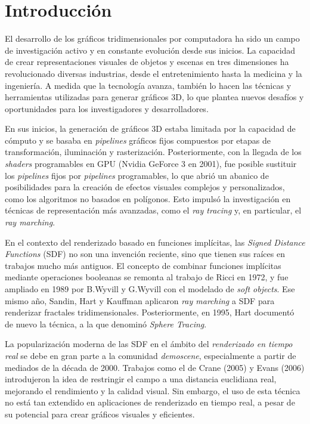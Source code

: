 \chapter{Introducción}
El desarrollo de los gráficos tridimensionales por computadora ha sido un campo
de investigación activo y en constante evolución desde sus inicios. La
capacidad de crear representaciones visuales de objetos y escenas en tres
dimensiones ha revolucionado diversas industrias, desde el entretenimiento
hasta la medicina y la ingeniería. A medida que la tecnología avanza, también
lo hacen las técnicas y herramientas utilizadas para generar gráficos 3D, lo
que plantea nuevos desafíos y oportunidades para los investigadores y
desarrolladores.

En sus inicios, la generación de gráficos 3D estaba limitada por la capacidad
de cómputo y se basaba en \textit{pipelines} gráficos fijos compuestos por
etapas de transformación, iluminación y rasterización. Posteriormente, con la
llegada de los \textit{shaders} programables en GPU (Nvidia GeForce 3 en 2001),
fue posible sustituir los \textit{pipelines} fijos por \textit{pipelines}
programables, lo que abrió un abanico de posibilidades para la creación de
efectos visuales complejos y personalizados, como los algoritmos no basados en
polígonos. Esto impulsó la investigación en técnicas de representación más
avanzadas, como el \textit{ray tracing} y, en particular, el \textit{ray
    marching}.

En el contexto del renderizado basado en funciones implícitas, las
\textit{Signed Distance Functions} (SDF) no son una invención reciente, sino
que tienen sus raíces en trabajos mucho más antiguos. El concepto de combinar
funciones implícitas mediante operaciones booleanas se remonta al trabajo de
Ricci en 1972\cite{Ricci:1973:CGC}, y fue ampliado en 1989 por B.Wyvill y
G.Wyvill con el modelado de \textit{soft objects}\cite{wyvill1989}. Ese
mismo año, Sandin, Hart y Kauffman aplicaron \textit{ray marching} a SDF para
renderizar fractales tridimensionales\cite{hart1989ray}. Posteriormente, en
1995, Hart documentó de nuevo la técnica, a la que denominó \textit{Sphere
    Tracing}\cite{hart1996}.

La popularización moderna de las SDF en el ámbito del \textit{renderizado en
    tiempo real} se debe en gran parte a la comunidad \textit{demoscene},
especialmente a partir de mediados de la década de 2000. Trabajos como el de
Crane (2005) y Evans (2006) introdujeron la idea de restringir el campo a una
distancia euclidiana real, mejorando el rendimiento y la calidad visual. Sin
embargo, el uso de esta técnica no está tan extendido en aplicaciones de
renderizado en tiempo real, a pesar de su potencial para crear gráficos
visuales y eficientes.
